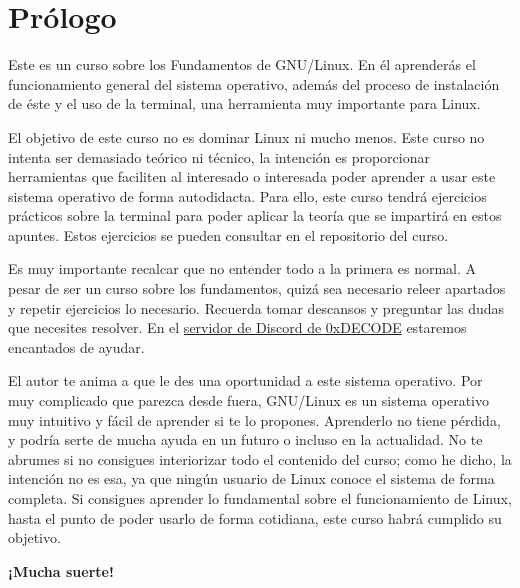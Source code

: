 \chapter{Prólogo}
Este es un curso sobre los Fundamentos de GNU/Linux. En él aprenderás el funcionamiento general del sistema operativo, además del proceso de instalación de éste y el uso de la terminal, una herramienta muy importante para Linux.

El objetivo de este curso no es dominar Linux ni mucho menos. Este curso no intenta ser demasiado teórico ni técnico, la intención es proporcionar herramientas que faciliten al interesado o interesada poder aprender a usar este sistema operativo de forma autodidacta. Para ello, este curso tendrá ejercicios prácticos sobre la terminal para poder aplicar la teoría que se impartirá en estos apuntes. Estos ejercicios se pueden consultar en el repositorio del curso.

Es muy importante recalcar que no entender todo a la primera es normal. A pesar de ser un curso sobre los fundamentos, quizá sea necesario releer apartados y repetir ejercicios lo necesario. Recuerda tomar descansos y preguntar las dudas que necesites resolver. En el \href{https://discord.gg/2qPvfCxD9U}{servidor de Discord de 0xDECODE} estaremos encantados de ayudar.

El autor te anima a que le des una oportunidad a este sistema operativo. Por muy complicado que parezca desde fuera, GNU/Linux es un sistema operativo muy intuitivo y fácil de aprender si te lo propones. Aprenderlo no tiene pérdida, y podría serte de mucha ayuda en un futuro o incluso en la actualidad. No te abrumes si no consigues interiorizar todo el contenido del curso; como he dicho, la intención no es esa, ya que ningún usuario de Linux conoce el sistema de forma completa. Si consigues aprender lo fundamental sobre el funcionamiento de Linux, hasta el punto de poder usarlo de forma cotidiana, este curso habrá cumplido su objetivo.


\textbf{¡Mucha suerte!}